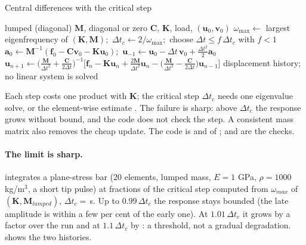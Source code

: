 
\begin{algbox}{Central differences with the critical step}
\begin{pseudo}
\Require lumped (diagonal) $\bm M$, diagonal or zero $\bm C$, $\bm K$, load, $(\bm u_0,\bm v_0)$
\State $\omega_{\max}\gets$ largest eigenfrequency of $(\bm K,\bm M)$;\ $\Delta t_c\gets2/\omega_{\max}$;\ choose $\Delta t\le f\,\Delta t_c$ with $f<1$
\State $\bm a_0\gets\bm M^{-1}(\bm f_0-\bm C\bm v_0-\bm K\bm u_0)$;\ $\bm u_{-1}\gets\bm u_0-\Delta t\,\bm v_0+\tfrac{\Delta t^2}{2}\bm a_0$
  \State $\bm u_{n+1}\gets\big(\tfrac{\bm M}{\Delta t^2}+\tfrac{\bm C}{2\Delta t}\big)^{-1}\big[\bm f_n-\bm K\bm u_n+\tfrac{2\bm M}{\Delta t^2}\bm u_n-\big(\tfrac{\bm M}{\Delta t^2}-\tfrac{\bm C}{2\Delta t}\big)\bm u_{n-1}\big]$ 
\EndFor
\Ensure displacement history; no linear system is solved
\end{pseudo}
\end{algbox}

Each step costs one product with $\bm K$; the critical step $\Delta t_c$ needs one eigenvalue solve, or the element-wise estimate . The failure is sharp: above $\Delta t_c$ the response grows without bound, and the code does not check the step. A consistent mass matrix also removes the cheap update. The code is  and  of ;  and  are the checks.

\paragraph{The limit is sharp.}
 integrates a plane-stress bar (20 elements, lumped mass, $E=1$ GPa, $\rho=1000$ kg/m$^3$, a short tip pulse) at fractions of the critical step computed from $\omega_{max}$ of $(\bm K,\bm M_{lumped})$, $\Delta t_c=$\,\cdyDtcLumped s. Up to $0.99\,\Delta t_c$ the response stays bounded (the late amplitude is within a few per cent of the early one). At $1.01\,\Delta t_c$ it grows by a factor \cdyGrowJustOver{} over the run and at $1.1\,\Delta t_c$ by \cdyGrowUnstable{}: a threshold, not a gradual degradation.  shows the two histories.

